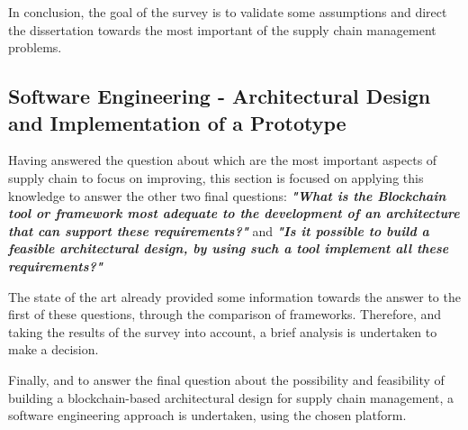 In conclusion, the goal of the survey is to validate some assumptions and direct the dissertation towards the most important  of the supply chain management problems.

\subsection{Software Engineering - Architectural Design and Implementation of a Prototype}

Having answered the question about which are the most important aspects of supply chain to focus on improving, this section is focused on applying this knowledge to answer the other two final questions: \textbf{\textit{"What is the Blockchain tool or framework most adequate to the development of an architecture that can support these requirements?"}} and 
\textbf{\textit{"Is it possible to build a feasible architectural design, by using such a tool implement all these requirements?"}}


The state of the art already provided some information towards the answer to the first of these questions, through the comparison of frameworks. Therefore, and taking the results of the survey into account, a brief analysis is undertaken to make a decision.


Finally, and to answer the final question about the possibility and feasibility of building a blockchain-based architectural design for supply chain management, a software engineering approach is undertaken, using the chosen platform. 


